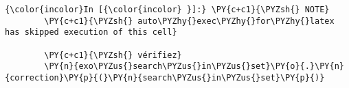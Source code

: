     \begin{Verbatim}[commandchars=\\\{\}]
{\color{incolor}In [{\color{incolor} }]:} \PY{c+c1}{\PYZsh{} NOTE}
        \PY{c+c1}{\PYZsh{} auto\PYZhy{}exec\PYZhy{}for\PYZhy{}latex has skipped execution of this cell}
        
        \PY{c+c1}{\PYZsh{} vérifiez}
        \PY{n}{exo\PYZus{}search\PYZus{}in\PYZus{}set}\PY{o}{.}\PY{n}{correction}\PY{p}{(}\PY{n}{search\PYZus{}in\PYZus{}set}\PY{p}{)}
\end{Verbatim}



    
    
    
